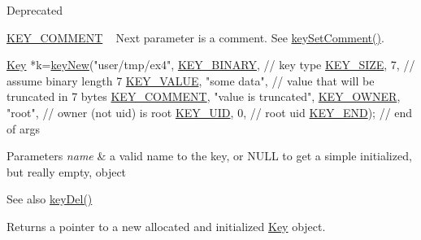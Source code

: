 \begin{DoxyRefDesc}{Deprecated}
\begin{DoxyItemize}
\item \hyperlink{group__key_gga91fb3178848bd682000958089abbaf40ac29427bb47cc31689d02912e36161ee3}{K\+E\+Y\+\_\+\+C\+O\+M\+M\+E\+NT} ~\newline
 Next parameter is a comment. See \hyperlink{group__meta_ga8863a877a84fa46e6017fe72e49b89c1}{key\+Set\+Comment()}. 
\begin{DoxyCodeInclude}
\hyperlink{classkdb_1_1Key_a5679f5cae63caddd64a60388b9cc77fa}{Key} *k=\hyperlink{group__key_gad23c65b44bf48d773759e1f9a4d43b89}{keyNew}(\textcolor{stringliteral}{"user/tmp/ex4"},
        \hyperlink{group__key_gga91fb3178848bd682000958089abbaf40a1ca18d4e094ae7487d35ecedda2235ff}{KEY\_BINARY},                   \textcolor{comment}{// key type}
        \hyperlink{group__key_gga91fb3178848bd682000958089abbaf40a6d531b5c41445d19d0452eebdccbfa01}{KEY\_SIZE}, 7,                    \textcolor{comment}{// assume binary length 7}
        \hyperlink{group__key_gga91fb3178848bd682000958089abbaf40ac66e4a49d09212b79f5754ca6db5bd2e}{KEY\_VALUE}, \textcolor{stringliteral}{"some data"},                \textcolor{comment}{// value that will be truncated in 7 bytes}
        \hyperlink{group__key_gga91fb3178848bd682000958089abbaf40ac29427bb47cc31689d02912e36161ee3}{KEY\_COMMENT}, \textcolor{stringliteral}{"value is truncated"},
        \hyperlink{group__key_gga91fb3178848bd682000958089abbaf40a77ca60362fa8daca8d5347db4385068b}{KEY\_OWNER}, \textcolor{stringliteral}{"root"},             \textcolor{comment}{// owner (not uid) is root}
        \hyperlink{group__key_gga91fb3178848bd682000958089abbaf40a28f01a87d65f065172f734c9c9446c0e}{KEY\_UID}, 0,                      \textcolor{comment}{// root uid}
        \hyperlink{group__key_gga91fb3178848bd682000958089abbaf40aa8adb6fcb92dec58fb19410eacfdd403}{KEY\_END});                        \textcolor{comment}{// end of args}
\end{DoxyCodeInclude}

\end{DoxyItemize}\end{DoxyRefDesc}



\begin{DoxyParams}{Parameters}
{\em name} & a valid name to the key, or N\+U\+LL to get a simple initialized, but really empty, object \\
\hline
\end{DoxyParams}
\begin{DoxySeeAlso}{See also}
\hyperlink{group__key_ga3df95bbc2494e3e6703ece5639be5bb1}{key\+Del()} 
\end{DoxySeeAlso}
\begin{DoxyReturn}{Returns}
a pointer to a new allocated and initialized \hyperlink{classkdb_1_1Key}{Key} object. 
\end{DoxyReturn}

